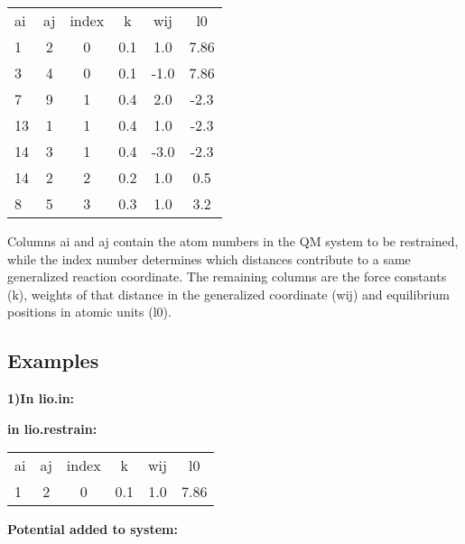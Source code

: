 \documentclass[journal=jctcce,manuscript=article]{achemso}
\begin{document}
    \begin{table}  [H]
      \begin{center}
      \begin{tabular}{ l c c c c c}
         ai & aj & index &   k  &    wij   &  l0    \\
         1  &  2 &   0   &  0.1 &    1.0   & 7.86   \\
         3  &  4 &   0   &  0.1 &   -1.0   & 7.86   \\
         7  &  9 &   1   &  0.4 &    2.0   & -2.3   \\
         13 &  1 &   1   &  0.4 &    1.0   & -2.3   \\
         14 &  3 &   1   &  0.4 &   -3.0   & -2.3   \\
         14 &  2 &   2   &  0.2 &    1.0   & 0.5    \\
         8  &  5 &   3   &  0.3 &    1.0   & 3.2    \\
       \end{tabular}
       \end{center}
      \label{lio.restrain}
    \end{table}

Columns ai and aj contain the atom numbers in the QM system to be restrained, while the index number determines which distances contribute to a same generalized reaction coordinate. The remaining columns are the force constants (k), weights of that distance in the generalized coordinate (wij) and equilibrium positions in atomic units (l0).

    \subsection{Examples}

    \textbf{1)In lio.in:}
    
        \textbf{in lio.restrain:}

    \begin{table}  [H]
      \begin{center}
      \begin{tabular}{ l c c c c c}
         ai & aj & index &   k  &    wij   &  l0    \\
         1  &  2 &   0   &  0.1 &    1.0   & 7.86   \\
       \end{tabular}
       \end{center}
      \label{Tex1}
    \end{table}

    \textbf{Potential added to system:}
\end{document}
